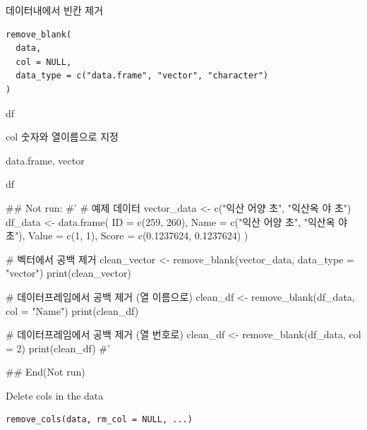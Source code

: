 \documentclass[a4paper]{book}
\begin{document}
%
\begin{Description}
데이터내에서 빈칸 제거
\end{Description}
%
\begin{Usage}
\begin{verbatim}
remove_blank(
  data,
  col = NULL,
  data_type = c("data.frame", "vector", "character")
)
\end{verbatim}
\end{Usage}
%
\begin{Arguments}
\begin{ldescription}
\item[\code{data}] df

\item[\code{col}] col 숫자와 열이름으로 지정

\item[\code{data\_type}] data.frame, vector
\end{ldescription}
\end{Arguments}
%
\begin{Value}
df
\end{Value}
%
\begin{Examples}
\begin{ExampleCode}
## Not run: 
#'
# 예제 데이터
vector_data <- c("익산 어양 초", "익산옥 야 초")
df_data <- data.frame(
  ID = c(259, 260),
  Name = c("익산 어양 초", "익산옥 야 초"),
  Value = c(1, 1),
  Score = c(0.1237624, 0.1237624)
)

# 벡터에서 공백 제거
clean_vector <- remove_blank(vector_data, data_type = "vector")
print(clean_vector)

# 데이터프레임에서 공백 제거 (열 이름으로)
clean_df <- remove_blank(df_data, col = "Name")
print(clean_df)

# 데이터프레임에서 공백 제거 (열 번호로)
clean_df <- remove_blank(df_data, col = 2)
print(clean_df)
#'


## End(Not run)
\end{ExampleCode}
\end{Examples}
%
\begin{Description}
Delete cols in the data
\end{Description}
%
\begin{Usage}
\begin{verbatim}
remove_cols(data, rm_col = NULL, ...)
\end{verbatim}
\end{Usage}
\end{document}
